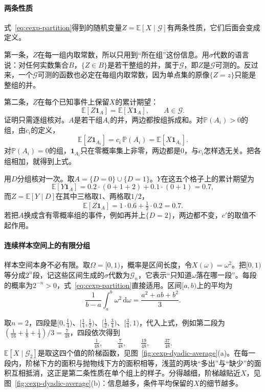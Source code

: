 \paragraph{两条性质}
式~\eqref{eq:cexp-partition}得到的随机变量$Z=\mathbb{E}[X\mid\mathcal{G}]$有两条性质，它们后面会变成定义。

第一条，$Z$在每一组内取常数，所以只用到“所在组”这份信息。用$\sigma$代数的语言说：对任何实数集合$B$，$\{Z\in B\}$是若干整组的并，属于$\mathcal{G}$，即$Z$是$\mathcal{G}$可测的。反过来，一个$\mathcal{G}$可测的函数也必定在每组内取常数，因为单点集的原像$\{Z=z\}$只能是整组的并。

第二条，$Z$在每个已知事件上保留$X$的累计期望：
\[
 \mathbb{E}[Z\mathbf{1}_{A}]=\mathbb{E}[X\mathbf{1}_{A}],\qquad A\in\mathcal{G}.
\]
证明只需逐组核对。$A$是若干组$A_i$的并，两边都按组拆成和。对$\mathbb{P}(A_i)>0$的组，由$c_i$的定义，
\[
 \mathbb{E}[Z\mathbf{1}_{A_i}]=c_i\,\mathbb{P}(A_i)=\mathbb{E}[X\mathbf{1}_{A_i}] .
\]
对$\mathbb{P}(A_i)=0$的组，$\mathbf{1}_{A_i}$只在零概率集上非零，两边都是$0$，与$c_i$怎样选无关。把各组相加，就得到上式。

用$D$分组核对一次。取$A=\{D=0\}\cup\{D=1\}$。$Y$在这五个格子上的累计期望为
\[
 \mathbb{E}[Y\mathbf{1}_{A}]=0.2\cdot(0+1+2)+0.1\cdot(0+1)=0.7 ,
\]
而$Z=\mathbb{E}[Y\mid D]$在其中三格取$1$、两格取$1/2$，
\[
 \mathbb{E}[Z\mathbf{1}_{A}]=1\cdot0.6+\tfrac12\cdot0.2=0.7 .
\]
若把$A$换成含有零概率组的事件，例如再并上$\{D=2\}$，两边都不变，$c'$的取值不起作用。

\paragraph{连续样本空间上的有限分组}
样本空间本身不必有限。取$\Omega=[0,1)$，概率是区间长度，令$X(\omega)=\omega^{2}$。把$[0,1)$等分成$2^{n}$段，记这些区间生成的$\sigma$代数为$\mathcal{G}_n$，它表示“只知道$\omega$落在哪一段”。每段的概率为$2^{-n}>0$，式~\eqref{eq:cexp-partition}直接适用。区间$[a,b)$上的平均为
\[
 \frac{1}{b-a}\int_{a}^{b}\omega^{2}\,\mathrm{d}\omega=\frac{a^{2}+ab+b^{2}}{3}.
\]

取$n=2$，四段是$[0,\tfrac14)$、$[\tfrac14,\tfrac12)$、$[\tfrac12,\tfrac34)$、$[\tfrac34,1)$，代入上式，例如第二段为$(\tfrac1{16}+\tfrac18+\tfrac14)/3=\tfrac{7}{48}$，四段依次得到
\[
 \tfrac{1}{48},\qquad \tfrac{7}{48},\qquad \tfrac{19}{48},\qquad \tfrac{37}{48}.
\]
$\mathbb{E}[X\mid\mathcal{G}_2]$是取这四个值的阶梯函数，见图~\ref{fig:cexp-dyadic-average}(a)。在每一段内，阶梯下方的面积与抛物线下方的面积相等，浅蓝的两块“多出”与“缺少”的面积互相抵消，这正是第二条性质在单个组上的样子。分得越细，阶梯越贴近$X$，见图~\ref{fig:cexp-dyadic-average}(b)：信息越多，条件平均保留的$X$的细节越多。

